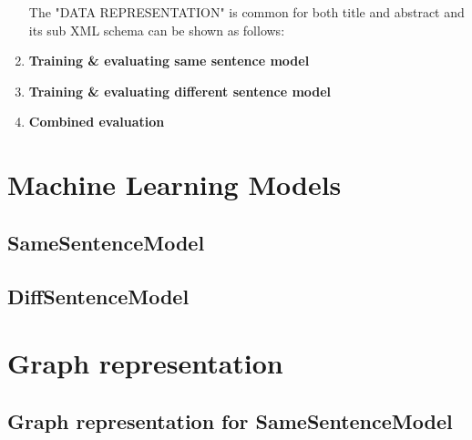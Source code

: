 \begin{enumerate}
\hspace{15 mm}

\hspace{10 mm}

\hspace{10 mm}

\hspace{15 mm}

\hspace{10 mm}
  
\hspace{5 mm}
  
\hspace{5 mm}
  

The "DATA REPRESENTATION" is common for both title and abstract and its sub XML schema can be shown as follows:


\item \textbf{Training \& evaluating same sentence model}
\item \textbf{Training \& evaluating different sentence model}
\item \textbf{Combined evaluation}
\end{enumerate}

\section{Machine Learning Models}\label{sec:models}

\subsection{SameSentenceModel}

\subsection{DiffSentenceModel}

\section{Graph representation} \label{sec:graphRep}

\subsection{Graph representation for SameSentenceModel}

